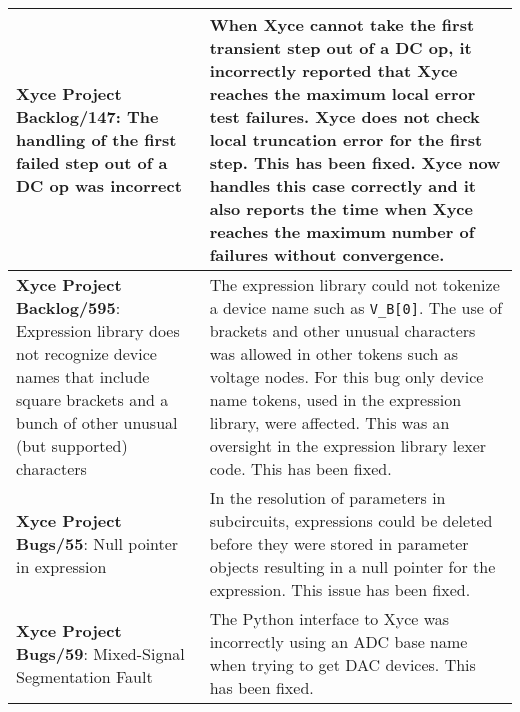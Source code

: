 {\begin{longtable}[h] {>{\raggedright\small}m{2in}|>{\raggedright\let\\\tabularnewline\small}m{3.5in}}
  \textbf{Xyce Project Backlog/147}: The handling of the first failed step out 
  of a DC op was incorrect & When Xyce cannot take the first transient step out
  of a DC op, it incorrectly reported that Xyce reaches the maximum local error
  test failures. Xyce does not check local truncation error for the first step.
  This has been fixed. Xyce now handles this case correctly and it also reports
  the time when Xyce reaches the maximum number of failures without
  convergence. \\ \hline   

 \textbf{Xyce Project Backlog/595}: 
   Expression library does not recognize device names that include square
    brackets and a bunch of other unusual (but supported) characters & 
   The expression library could not tokenize a device name such as \texttt{V\_B[0]}. 
   The use of brackets and other unusual characters was allowed in other tokens 
   such as voltage nodes.  For this bug only device name tokens, used in the expression 
   library, were affected.  This was an oversight in the expression library lexer code. 
   This has been fixed.  \\ \hline

  \textbf{Xyce Project Bugs/55}: Null pointer in expression &
  In the resolution of parameters in subcircuits, expressions
  could be deleted before they were stored in parameter objects
  resulting in a null pointer for the expression.  This issue
  has been fixed. \\ \hline
  
  
\textbf{Xyce Project Bugs/59}: Mixed-Signal Segmentation Fault &
  The Python interface to Xyce was incorrectly using an ADC 
  base name when trying to get DAC devices.  This has been fixed. \\ \hline

\end{longtable}
}
